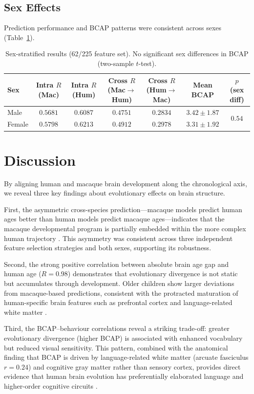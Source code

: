 \documentclass[11pt]{article}
\begin{document}
\subsection{Sex Effects}

Prediction performance and BCAP patterns were consistent across sexes (Table~\ref{tab:sex}).

\begin{table}[H]
\centering
\caption{Sex-stratified results (62/225 feature set). No significant sex differences in BCAP (two-sample $t$-test).}
\label{tab:sex}
\begin{tabular}{lcccccc}
\toprule
Sex & Intra $R$ (Mac) & Intra $R$ (Hum) & Cross $R$ (Mac$\to$Hum) & Cross $R$ (Hum$\to$Mac) & Mean BCAP & $p$ (sex diff) \\
\midrule
Male & $0.5681$ & $0.6087$ & $0.4751$ & $0.2834$ & $3.42 \pm 1.87$ & \multirow{2}{*}{$0.54$} \\
Female & $0.5798$ & $0.6213$ & $0.4912$ & $0.2978$ & $3.31 \pm 1.92$ & \\
\bottomrule
\end{tabular}
\end{table}

\section{Discussion}

By aligning human and macaque brain development along the chronological axis, we reveal three key findings about evolutionary effects on brain structure.

First, the asymmetric cross-species prediction---macaque models predict human ages better than human models predict macaque ages---indicates that the macaque developmental program is partially embedded within the more complex human trajectory \citep{leigh2004brain}. This asymmetry was consistent across three independent feature selection strategies and both sexes, supporting its robustness.

Second, the strong positive correlation between absolute brain age gap and human age ($R = 0.98$) demonstrates that evolutionary divergence is not static but accumulates through development. Older children show larger deviations from macaque-based predictions, consistent with the protracted maturation of human-specific brain features such as prefrontal cortex and language-related white matter \citep{bethlehem2022brain, hill2010similar}.

Third, the BCAP--behaviour correlations reveal a striking trade-off: greater evolutionary divergence (higher BCAP) is associated with enhanced vocabulary but reduced visual sensitivity. This pattern, combined with the anatomical finding that BCAP is driven by language-related white matter (arcuate fasciculus $r = 0.24$) and cognitive gray matter rather than sensory cortex, provides direct evidence that human brain evolution has preferentially elaborated language and higher-order cognitive circuits \citep{rilling2008evolution, defelipe2011evolution, rakic2009evolution}.
\end{document}
